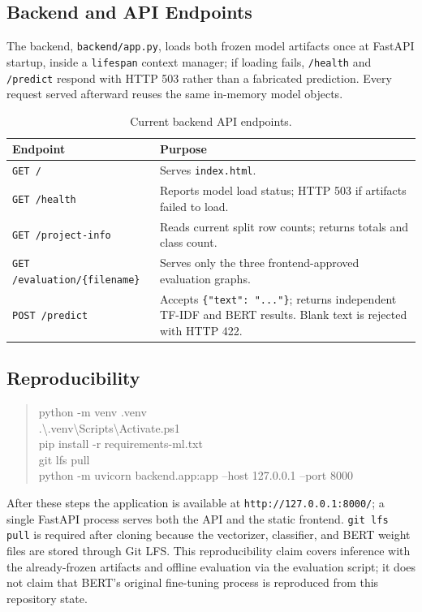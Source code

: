 \documentclass[12pt,a4paper]{article}
\newcommand{\pbrk}{\discretionary{}{}{}}
\begin{document}
\subsection{Backend and API Endpoints}

The backend, \texttt{backend/\pbrk app.py}, loads both frozen model artifacts once at FastAPI startup, inside a \texttt{lifespan} context manager; if loading fails, \texttt{/health} and \texttt{/predict} respond with HTTP 503 rather than a fabricated prediction. Every request served afterward reuses the same in-memory model objects.

\begin{table}[H]
\centering
\caption{Current backend API endpoints.}
\begin{tabular}{lp{9.3cm}}
\toprule
\textbf{Endpoint} & \textbf{Purpose} \\
\midrule
\texttt{GET /} & Serves \texttt{index.html}. \\
\texttt{GET /health} & Reports model load status; HTTP 503 if artifacts failed to load. \\
\texttt{GET /project-info} & Reads current split row counts; returns totals and class count. \\
\texttt{GET /evaluation/\{filename\}} & Serves only the three frontend-approved evaluation graphs. \\
\texttt{POST /predict} & Accepts \texttt{\{"text": "..."\}}; returns independent TF-IDF and BERT results. Blank text is rejected with HTTP 422. \\
\bottomrule
\end{tabular}
\end{table}

\subsection{Reproducibility}

\begin{quote}
\ttfamily\small
python -m venv .venv\\
.\textbackslash .venv\textbackslash Scripts\textbackslash Activate.ps1\\
pip install -r requirements-ml.txt\\
git lfs pull\\
python -m uvicorn backend.app:app --host 127.0.0.1 --port 8000
\end{quote}

After these steps the application is available at \texttt{http://127.0.0.1:8000/}; a single FastAPI process serves both the API and the static frontend. \texttt{git lfs pull} is required after cloning because the vectorizer, classifier, and BERT weight files are stored through Git LFS. This reproducibility claim covers inference with the already-frozen artifacts and offline evaluation via the evaluation script; it does not claim that BERT's original fine-tuning process is reproduced from this repository state.
\end{document}
